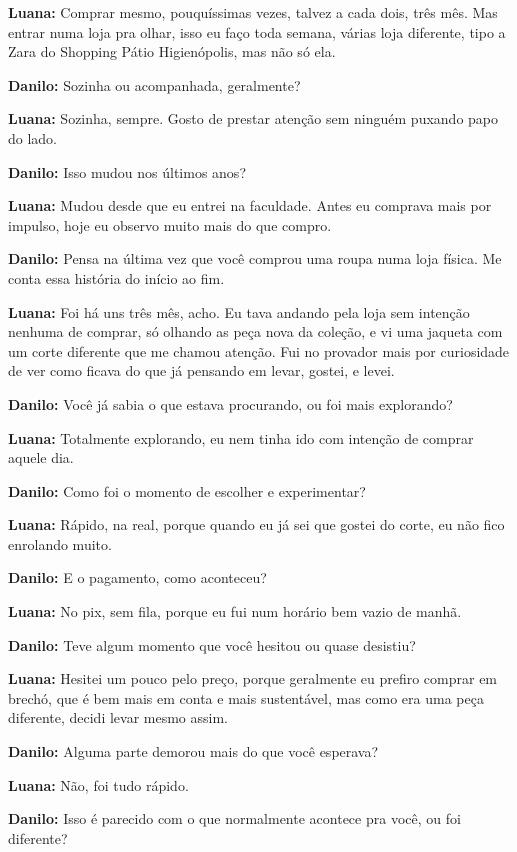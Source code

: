 \textbf{Luana:} Comprar mesmo, pouquíssimas vezes, talvez a cada dois, três mês. Mas entrar numa loja pra olhar, isso eu faço toda semana, várias loja diferente, tipo a Zara do Shopping Pátio Higienópolis, mas não só ela.

\textbf{Danilo:} Sozinha ou acompanhada, geralmente?

\textbf{Luana:} Sozinha, sempre. Gosto de prestar atenção sem ninguém puxando papo do lado.

\textbf{Danilo:} Isso mudou nos últimos anos?

\textbf{Luana:} Mudou desde que eu entrei na faculdade. Antes eu comprava mais por impulso, hoje eu observo muito mais do que compro.

\textbf{Danilo:} Pensa na última vez que você comprou uma roupa numa loja física. Me conta essa história do início ao fim.

\textbf{Luana:} Foi há uns três mês, acho. Eu tava andando pela loja sem intenção nenhuma de comprar, só olhando as peça nova da coleção, e vi uma jaqueta com um corte diferente que me chamou atenção. Fui no provador mais por curiosidade de ver como ficava do que já pensando em levar, gostei, e levei.

\textbf{Danilo:} Você já sabia o que estava procurando, ou foi mais explorando?

\textbf{Luana:} Totalmente explorando, eu nem tinha ido com intenção de comprar aquele dia.

\textbf{Danilo:} Como foi o momento de escolher e experimentar?

\textbf{Luana:} Rápido, na real, porque quando eu já sei que gostei do corte, eu não fico enrolando muito.

\textbf{Danilo:} E o pagamento, como aconteceu?

\textbf{Luana:} No pix, sem fila, porque eu fui num horário bem vazio de manhã.

\textbf{Danilo:} Teve algum momento que você hesitou ou quase desistiu?

\textbf{Luana:} Hesitei um pouco pelo preço, porque geralmente eu prefiro comprar em brechó, que é bem mais em conta e mais sustentável, mas como era uma peça diferente, decidi levar mesmo assim.

\textbf{Danilo:} Alguma parte demorou mais do que você esperava?

\textbf{Luana:} Não, foi tudo rápido.

\textbf{Danilo:} Isso é parecido com o que normalmente acontece pra você, ou foi diferente?


